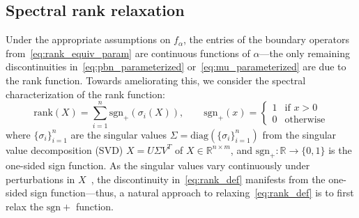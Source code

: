\documentclass[10pt]{article}
\numberwithin{equation}{section}
\newcommand{\+}{%
	\raisebox{0.18ex}{\scaleobj{0.55}{+}}
}
\theoremstyle{definition}
\theoremstyle{definition}
\begin{document}
\subsection{Spectral rank relaxation}\label{sec:spectral_relax}
Under the appropriate assumptions on $f_\alpha$, the entries of the boundary operators from~\eqref{eq:rank_equiv_param} are continuous functions of $\alpha$---the only remaining discontinuities in~\eqref{eq:pbn_parameterized} or~\eqref{eq:mu_parameterized} are due to the rank function. Towards ameliorating this, we consider the spectral characterization of the rank function:
\begin{equation}\label{eq:rank_def}
	\mathrm{rank}(X) = \sum\limits_{i=1}^{n} \mathrm{sgn}_+(\sigma_i(X)), \quad \quad \mathrm{sgn}_{+}(x) = \begin{cases}
		1 & \text{if } x > 0 \\
		0 & \text{otherwise}
	\end{cases}
\end{equation}
where $\{\sigma_i \}_{i=1}^n$ are the singular values $\Sigma = \mathrm{diag}(\{\sigma_i \}_{i=1}^n)$ from the singular value decomposition (SVD) $X = U \Sigma V^T$ of $X \in \mathbb{R}^{n \times m}$, and $\mathrm{sgn}_+: \mathbb{R} \to \{0, 1\}$ is the one-sided sign function. 
 As the singular values vary continuously under perturbations in $X$~\cite{bhatia2013matrix}, the discontinuity in~\eqref{eq:rank_def} manifests from the one-sided sign function---thus, a natural approach to relaxing~\eqref{eq:rank_def} is to first relax the $\mathrm{sgn}+$ function.
\end{document}
